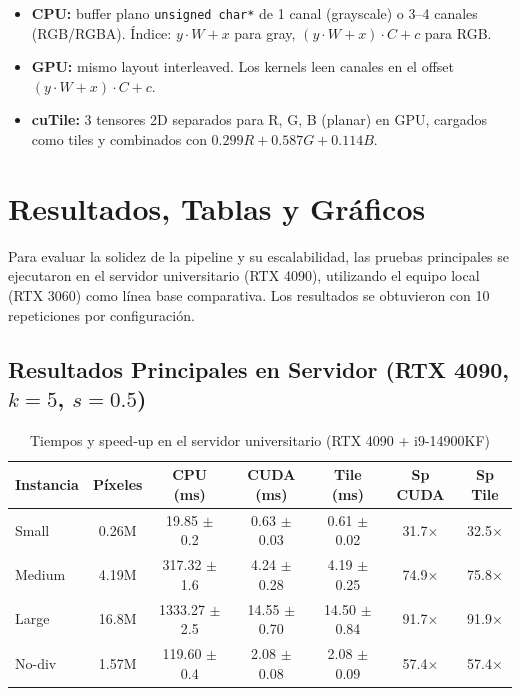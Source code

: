 \documentclass[12pt,a4paper]{article}
\begin{document}
\begin{itemize}
  \item \textbf{CPU:} buffer plano \texttt{unsigned char*} de 1 canal (grayscale) o 3--4 canales (RGB/RGBA). \'Indice: $y \cdot W + x$ para gray, $(y \cdot W + x) \cdot C + c$ para RGB.
  \item \textbf{GPU:} mismo layout interleaved. Los kernels leen canales en el offset $(y \cdot W + x) \cdot C + c$.
  \item \textbf{cuTile:} 3 tensores 2D separados para R, G, B (planar) en GPU, cargados como tiles y combinados con $0.299R + 0.587G + 0.114B$.
\end{itemize}

\section{Resultados, Tablas y Gr\'aficos}

Para evaluar la solidez de la pipeline y su escalabilidad, las pruebas principales se ejecutaron en el servidor universitario (RTX 4090), utilizando el equipo local (RTX 3060) como l\'inea base comparativa. Los resultados se obtuvieron con 10 repeticiones por configuraci\'on.

\subsection{Resultados Principales en Servidor (RTX 4090, $k=5$, $s=0.5$)}

\begin{table}[H]
\centering
\caption{Tiempos y speed-up en el servidor universitario (RTX 4090 + i9-14900KF)}
\label{tab:server_main}
\begin{tabular}{lcccccc}
\toprule
\textbf{Instancia} & \textbf{P\'ixeles} & \textbf{CPU (ms)} & \textbf{CUDA (ms)} & \textbf{Tile (ms)} & \textbf{Sp CUDA} & \textbf{Sp Tile} \\
\midrule
Small    & 0.26M & 19.85 $\pm$ 0.2  & 0.63 $\pm$ 0.03 & 0.61 $\pm$ 0.02 & 31.7$\times$ & 32.5$\times$ \\
Medium   & 4.19M & 317.32 $\pm$ 1.6 & 4.24 $\pm$ 0.28 & 4.19 $\pm$ 0.25 & 74.9$\times$ & 75.8$\times$ \\
Large    & 16.8M & 1333.27 $\pm$ 2.5& 14.55 $\pm$ 0.70& 14.50 $\pm$ 0.84& 91.7$\times$ & 91.9$\times$ \\
No-div   & 1.57M & 119.60 $\pm$ 0.4 & 2.08 $\pm$ 0.08 & 2.08 $\pm$ 0.09 & 57.4$\times$ & 57.4$\times$ \\
\bottomrule
\end{tabular}
\end{table}
\end{document}
